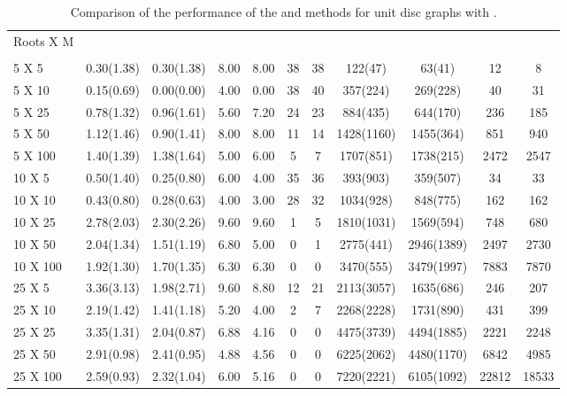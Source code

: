\begin{table*}[htb]
\footnotesize
\center
\caption{\label{table:Alpha2}
Comparison of the performance of the  and  methods for  unit disc graphs with .}
\begin{tabularx}{430pt}{X*{10}{c}}

\toprule
Roots X M&  \multicolumn{2}{c}{}  & \multicolumn{2}{c}{} & \multicolumn{2}{c}{}& \multicolumn{2}{c}{}& \multicolumn{2}{c}{}\\

&  &   &   &  &   & &  & &   & \\

\midrule
5 X 5 & 0.30(1.38) & 0.30(1.38) & 8.00 & 8.00 & 38 & 38 & 122(47) & 63(41) & 12 & 8 \\
5 X 10 & 0.15(0.69) & 0.00(0.00) & 4.00 & 0.00 & 38 & 40 & 357(224) & 269(228) & 40 & 31 \\
5 X 25 & 0.78(1.32) & 0.96(1.61) & 5.60 & 7.20 & 24 & 23 & 884(435) & 644(170) & 236 & 185 \\
5 X 50 & 1.12(1.46) & 0.90(1.41) & 8.00 & 8.00 & 11 & 14 & 1428(1160) & 1455(364) & 851 & 940 \\
5 X 100 & 1.40(1.39) & 1.38(1.64) & 5.00 & 6.00 & 5 & 7 & 1707(851) & 1738(215) & 2472 & 2547 \\
\midrule
10 X 5 & 0.50(1.40) & 0.25(0.80) & 6.00 & 4.00 & 35 & 36 & 393(903) & 359(507) & 34 & 33 \\
10 X 10 & 0.43(0.80) & 0.28(0.63) & 4.00 & 3.00 & 28 & 32 & 1034(928) & 848(775) & 162 & 162 \\
10 X 25 & 2.78(2.03) & 2.30(2.26) & 9.60 & 9.60 & 1 & 5 & 1810(1031) & 1569(594) & 748 & 680 \\
10 X 50 & 2.04(1.34) & 1.51(1.19) & 6.80 & 5.00 & 0 & 1 & 2775(441) & 2946(1389) & 2497 & 2730 \\
10 X 100 & 1.92(1.30) & 1.70(1.35) & 6.30 & 6.30 & 0 & 0 & 3470(555) & 3479(1997) & 7883 & 7870 \\
\midrule
25 X 5 & 3.36(3.13) & 1.98(2.71) & 9.60 & 8.80 & 12 & 21 & 2113(3057) & 1635(686) & 246 & 207 \\
25 X 10 & 2.19(1.42) & 1.41(1.18) & 5.20 & 4.00 & 2 & 7 & 2268(2228) & 1731(890) & 431 & 399 \\
25 X 25 & 3.35(1.31) & 2.04(0.87) & 6.88 & 4.16 & 0 & 0 & 4475(3739) & 4494(1885) & 2221 & 2248 \\
25 X 50 & 2.91(0.98) & 2.41(0.95) & 4.88 & 4.56 & 0 & 0 & 6225(2062) & 4480(1170) & 6842 & 4985 \\
25 X 100 & 2.59(0.93) & 2.32(1.04) & 6.00 & 5.16 & 0 & 0 & 7220(2221) & 6105(1092) & 22812 & 18533 \\

\end{tabularx}
\end{table*}
